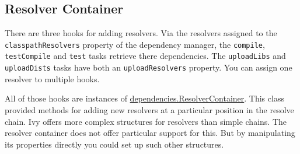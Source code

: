 \subsection{Resolver Container} %
\label{sub:resolver_container}
There are three hooks for adding resolvers. Via the resolvers assigned to the \texttt{classpathResolvers} property of the dependency manager, the \texttt{compile}, \texttt{testCompile} and \texttt{test} tasks retrieve there dependencies. The \texttt{uploadLibs} and \texttt{uploadDists} tasks have both an \texttt{uploadResolvers} property. You can assign one resolver to multiple hooks.

All of those hooks are instances of \href{\API dependencies/ResolverContainer.html}{\PKG dependencies.ResolverContainer}. This class provided methods for adding new resolvers at a particular position in the resolve chain. Ivy offers more complex structures for resolvers than simple chains. The resolver container does not offer particular support for this. But by manipulating its properties directly you could set up such other structures.

